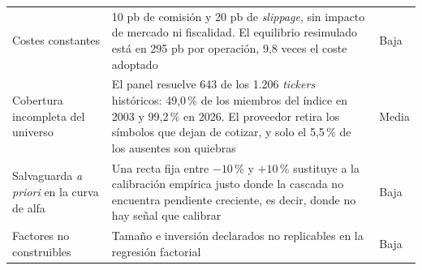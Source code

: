 \begin{tabularx}{\textwidth}{lXl}
\addlinespace
Costes constantes &
10 pb de comisión y 20 pb de \textit{slippage}, sin impacto de mercado ni fiscalidad. El equilibrio
resimulado está en 295 pb por operación, 9,8 veces el coste adoptado &
Baja \\
\addlinespace
Cobertura incompleta del universo &
El panel resuelve 643 de los 1.206 \textit{tickers} históricos: 49,0\,\% de los miembros del índice
en 2003 y 99,2\,\% en 2026. El proveedor retira los símbolos que dejan de cotizar, y solo el
5,5\,\% de los ausentes son quiebras &
Media \\
\addlinespace
Salvaguarda \textit{a priori} en la curva de alfa &
Una recta fija entre $-10$\,\% y $+10$\,\% sustituye a la calibración empírica justo donde la
cascada no encuentra pendiente creciente, es decir, donde no hay señal que calibrar &
Baja \\
\addlinespace
Factores no construibles &
Tamaño e inversión declarados no replicables en la regresión factorial &
Baja \\
\bottomrule
\end{tabularx}
